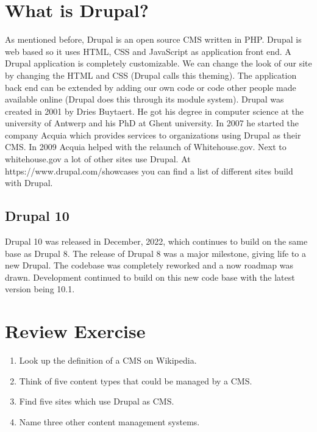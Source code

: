 \section{What is Drupal?}
As mentioned before, Drupal is an open source CMS written in PHP. Drupal is web based so it uses HTML, CSS and JavaScript as application front end. A Drupal application is completely customizable. We can change the look of our site by changing the HTML and CSS (Drupal calls this theming).
The application back end can be extended by adding our own code or code other people made available online (Drupal does this through its module system).
Drupal was created in 2001 by Dries Buytaert. He got his degree in computer science at the university of Antwerp and his PhD at Ghent university. In 2007 he started the company Acquia which provides services to organizations using Drupal as their CMS. In 2009 Acquia helped with the relaunch of Whitehouse.gov. Next to whitehouse.gov a lot of other sites use Drupal. At https://www.drupal.com/showcases you can find a list of different sites build with Drupal.

\subsection{Drupal 10}
Drupal 10 was released in December, 2022, which continues to build on the same base as Drupal 8. The release of Drupal 8 was a major milestone, giving life to a new Drupal. The codebase was completely reworked and a now roadmap was drawn. Development continued to build on this new code base with the latest version being 10.1.

\section{Review Exercise}
\begin{enumerate}
    \item Look up the definition of a CMS on Wikipedia.
    \item Think of five content types that could be managed by a CMS.
    \item Find five sites which use Drupal as CMS.
    \item Name three other content management systems.
\end{enumerate}

